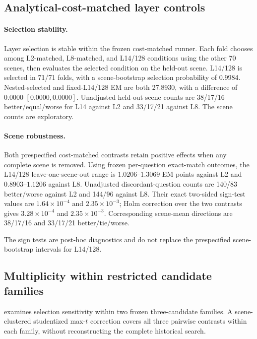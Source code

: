 \subsection{Analytical-cost-matched layer controls}
\paragraph{Selection stability.} Layer selection is stable within the frozen cost-matched runner. Each fold chooses among L2-matched, L8-matched, and L14/128 conditions using the other 70 scenes, then evaluates the selected condition on the held-out scene. L14/128 is selected in 71/71 folds, with a scene-bootstrap selection probability of 0.9984. Nested-selected and fixed-L14/128 EM are both 27.8930, with a difference of 0.0000 $[0.0000,0.0000]$. Unadjusted held-out scene counts are 38/17/16 better/equal/worse for L14 against L2 and 33/17/21 against L8. The scene counts are exploratory.

\paragraph{Scene robustness.} Both prespecified cost-matched contrasts retain positive effects when any complete scene is removed. Using frozen per-question exact-match outcomes, the L14/128 leave-one-scene-out range is $1.0206$--$1.3069$ EM points against L2 and $0.8903$--$1.1206$ against L8. Unadjusted discordant-question counts are 140/83 better/worse against L2 and 144/96 against L8. Their exact two-sided sign-test values are $1.64\times10^{-4}$ and $2.35\times10^{-3}$; Holm correction over the two contrasts gives $3.28\times10^{-4}$ and $2.35\times10^{-3}$. Corresponding scene-mean directions are 38/17/16 and 33/17/21 better/tie/worse.

The sign tests are post-hoc diagnostics and do not replace the prespecified scene-bootstrap intervals for L14/128.

\subsection{Multiplicity within restricted candidate families}
 examines selection sensitivity within two frozen three-candidate families. A scene-clustered studentized max-$t$ correction covers all three pairwise contrasts within each family, without reconstructing the complete historical search.

